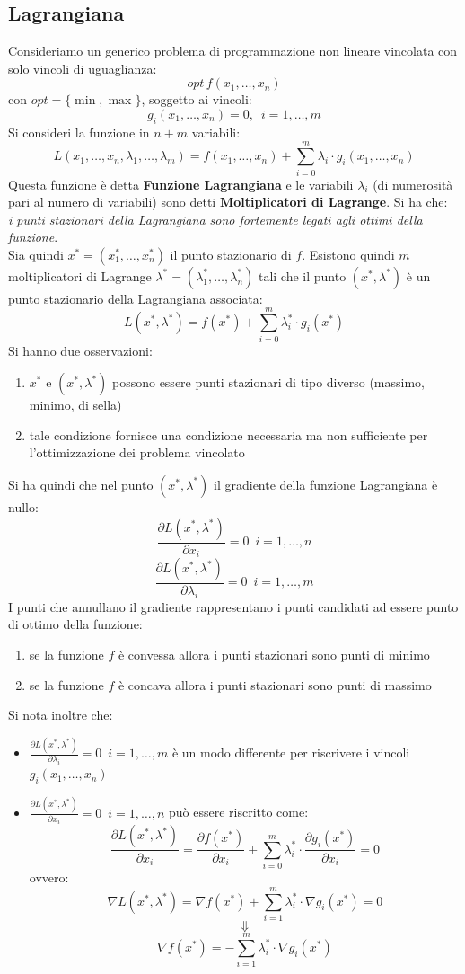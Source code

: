 \message{ !name(ro.tex)}\documentclass[a4paper,12pt, oneside]{book}
\begin{document}
\subsection{Lagrangiana}
Consideriamo un generico problema di programmazione non lineare
vincolata con solo vincoli di uguaglianza:
\[opt\,f(x_1,\ldots,x_n)\]
con $opt=\{\min,\max\}$, soggetto ai vincoli:
\[g_i(x_1,\ldots,x_n)=0,\,\,\,i=1,\ldots,m\]
Si consideri la funzione in $n+m$ variabili:
\[L(x_1,\ldots,x_n,\lambda_1,\ldots,\lambda_m)=f(x_1,\ldots,x_n)+
  \sum_{i=0}^m\lambda_i\cdot g_i(x_1,\ldots,x_n)\]
Questa funzione è detta \textbf{Funzione Lagrangiana} e le variabili
$\lambda_i$ (di numerosità pari al numero di variabili) sono detti
\textbf{Moltiplicatori di Lagrange}. Si ha che:\\
\textit{i punti stazionari della Lagrangiana sono fortemente legati
  agli ottimi della funzione}.\\
Sia quindi $x^*=(x_1^*,\ldots,x_n^*)$ il punto stazionario di
$f$. Esistono quindi $m$ moltiplicatori di Lagrange
$\lambda^*=(\lambda_1^*,\ldots, \lambda_n^*)$ tali che il punto
$(x^*,\lambda^*)$ è un punto stazionario della Lagrangiana associata:
\[L(x^*,\lambda^*)=f(x^*)+\sum_{i=0}^m\lambda_i^*\cdot g_i(x^*)\]
Si hanno due osservazioni:
\begin{enumerate}
 \item $x^*$ e $(x^*,\lambda^*)$ possono essere punti stazionari di
 tipo diverso (massimo, minimo, di sella)
 \item tale condizione fornisce una condizione necessaria ma non
 sufficiente per l’ottimizzazione dei problema vincolato 
\end{enumerate}
Si ha quindi che nel punto $(x^*,\lambda^*)$ il gradiente della
funzione Lagrangiana è nullo:
\[\frac{\partial L(x^*,\lambda^*)}{\partial
    x_i}=0\,\,\,i=1,\ldots,n\]
\[\frac{\partial L(x^*,\lambda^*)}{\partial
    \lambda_i}=0\,\,\,i=1,\ldots,m\]
I punti che annullano il gradiente rappresentano i punti candidati ad
essere punto di ottimo della funzione:
\begin{enumerate}
  \item se la funzione $f$ è convessa allora i punti stazionari sono
  punti di minimo
  \item se la funzione $f$ è concava allora i punti stazionari sono
  punti di massimo 
\end{enumerate}
Si nota inoltre che:
\begin{itemize}
  \item $\frac{\partial L(x^*,\lambda^*)}{\partial
    \lambda_i}=0\,\,\,i=1,\ldots,m$ è un modo differente per
  riscrivere i vincoli $g_i(x_1,\ldots,x_n)$
  \item  $\frac{\partial L(x^*,\lambda^*)}{\partial
    x_i}=0\,\,\,i=1,\ldots,n$ può essere riscritto come:
  \[\frac{\partial L(x^*,\lambda^*)}{\partial
      x_i}=\frac{\partial f(x^*)}{\partial
      x_i}+\sum_{i=0}^m\lambda_i^*\cdot \frac{\partial
      g_i(x^*)}{\partial x_i}=0\]
  \newpage
  ovvero:
  \[\nabla L(x^*,\lambda^*)=\nabla
    f(x^*)+\sum_{i=1}^m\lambda_i^*\cdot \nabla g_i(x^*)=0\]
  \[\Downarrow\]
  \[\nabla f(x^*)=-\sum_{i=1}^m\lambda_i^*\cdot \nabla g_i(x^*)\]
\end{itemize}
\end{document}
